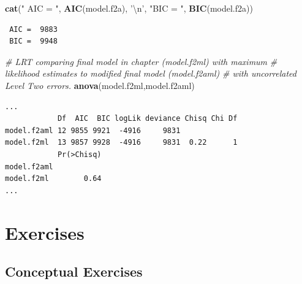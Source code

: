 \documentclass[
]{krantz}
\newenvironment{Shaded}{\begin{snugshade}}{\end{snugshade}}
\newcommand{\CharTok}[1]{\textcolor[rgb]{0.5,0.5,0.5}{#1}}
\newcommand{\CommentTok}[1]{\textcolor[rgb]{0.37,0.37,0.37}{\textit{#1}}}
\newcommand{\KeywordTok}[1]{\textcolor[rgb]{0.27,0.27,0.27}{\textbf{#1}}}
\newcommand{\NormalTok}[1]{#1}
\newcommand{\StringTok}[1]{\textcolor[rgb]{0.5,0.5,0.5}{#1}}
\begin{document}
\begin{Shaded}
\begin{Highlighting}[]
\KeywordTok{cat}\NormalTok{(}\StringTok{" AIC = "}\NormalTok{, }\KeywordTok{AIC}\NormalTok{(model.f2a), }\StringTok{'}\CharTok{\textbackslash{}n}\StringTok{'}\NormalTok{, }\StringTok{"BIC = "}\NormalTok{, }\KeywordTok{BIC}\NormalTok{(model.f2a))}
\end{Highlighting}
\end{Shaded}

\begin{verbatim}
 AIC =  9883 
 BIC =  9948
\end{verbatim}

\begin{Shaded}
\begin{Highlighting}[]
\CommentTok{# LRT comparing final model in chapter (model.f2ml) with maximum}
\CommentTok{#  likelihood estimates to modified final model (model.f2aml)}
\CommentTok{#  with uncorrelated Level Two errors.}
\KeywordTok{anova}\NormalTok{(model.f2ml,model.f2aml)}
\end{Highlighting}
\end{Shaded}

\begin{verbatim}
...
            Df  AIC  BIC logLik deviance Chisq Chi Df
model.f2aml 12 9855 9921  -4916     9831             
model.f2ml  13 9857 9928  -4916     9831  0.22      1
            Pr(>Chisq)
model.f2aml           
model.f2ml        0.64
...
\end{verbatim}

\hypertarget{exercises-8}{%
\section{Exercises}\label{exercises-8}}

\hypertarget{conceptual-exercises-6}{%
\subsection{Conceptual Exercises}\label{conceptual-exercises-6}}
\end{document}
